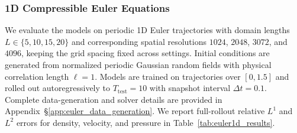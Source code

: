\documentclass[11pt]{article}
\begin{document}
\subsubsection{1D Compressible Euler Equations}
\label{sec:euler_results}

We evaluate the models on periodic 1D Euler trajectories with domain lengths $L\in\{5,10,15,20\}$ and corresponding spatial resolutions $1024$, $2048$, $3072$, and $4096$, keeping the grid spacing fixed across settings. Initial conditions are generated from normalized periodic Gaussian random fields with physical correlation length $\ell=1$. Models are trained on trajectories over $[0,1.5]$ and rolled out autoregressively to $T_{\mathrm{test}}=10$ with snapshot interval $\Delta t=0.1$. Complete data-generation and solver details are provided in Appendix~\S\ref{app:euler_data_generation}. We report full-rollout relative $L^1$ and $L^2$ errors for density, velocity, and pressure in Table~\ref{tab:euler1d_results}.
\end{document}
